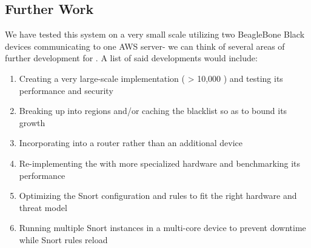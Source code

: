\subsection{Further Work}
\label{sec:concl:further}
We have tested this system on a very small scale utilizing two BeagleBone Black devices communicating to one AWS server- we can think of several areas of further development for \sysname. A list of said developments would include:

\begin{enumerate}
\item Creating a very large-scale implementation ( > 10,000 \nodenames) and testing its performance and security
\item Breaking up \servnames into regions and/or caching the blacklist so as to bound its growth
\item Incorporating \sysname into a router rather than an additional device
\item Re-implementing the \nodename with more specialized hardware and benchmarking its performance
\item Optimizing the Snort configuration and rules to fit the right hardware and threat model
\item Running multiple Snort instances in a multi-core device to prevent downtime while Snort rules reload
\end{enumerate}




